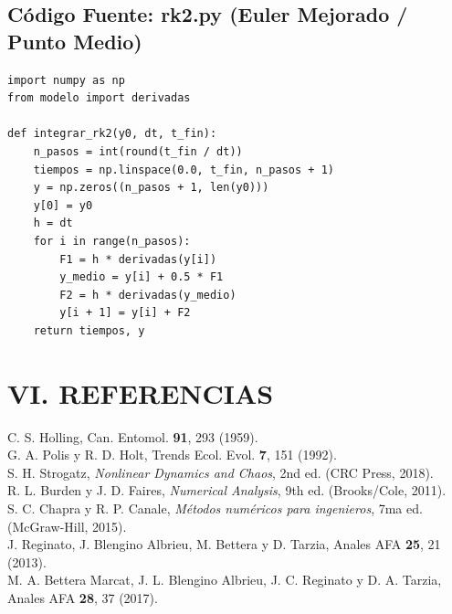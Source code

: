 \documentclass[10pt,twocolumn,a4paper]{article}
\begin{document}
\subsection{Código Fuente: rk2.py (Euler Mejorado / Punto Medio)}
\begin{lstlisting}
import numpy as np
from modelo import derivadas

def integrar_rk2(y0, dt, t_fin):
    n_pasos = int(round(t_fin / dt))
    tiempos = np.linspace(0.0, t_fin, n_pasos + 1)
    y = np.zeros((n_pasos + 1, len(y0)))
    y[0] = y0
    h = dt
    for i in range(n_pasos):
        F1 = h * derivadas(y[i])
        y_medio = y[i] + 0.5 * F1
        F2 = h * derivadas(y_medio)
        y[i + 1] = y[i] + F2
    return tiempos, y
\end{lstlisting}

\section{VI. REFERENCIAS}
\small
\noindent [1] C. S. Holling, Can. Entomol. \textbf{91}, 293 (1959).\\
\noindent [2] G. A. Polis y R. D. Holt, Trends Ecol. Evol. \textbf{7}, 151 (1992).\\
\noindent [3] S. H. Strogatz, \textit{Nonlinear Dynamics and Chaos}, 2nd ed. (CRC Press, 2018).\\
\noindent [4] R. L. Burden y J. D. Faires, \textit{Numerical Analysis}, 9th ed. (Brooks/Cole, 2011).\\
\noindent [5] S. C. Chapra y R. P. Canale, \textit{Métodos numéricos para ingenieros}, 7ma ed. (McGraw-Hill, 2015).\\
\noindent [6] J. Reginato, J. Blengino Albrieu, M. Bettera y D. Tarzia, Anales AFA \textbf{25}, 21 (2013).\\
\noindent [7] M. A. Bettera Marcat, J. L. Blengino Albrieu, J. C. Reginato y D. A. Tarzia, Anales AFA \textbf{28}, 37 (2017).
\end{document}

